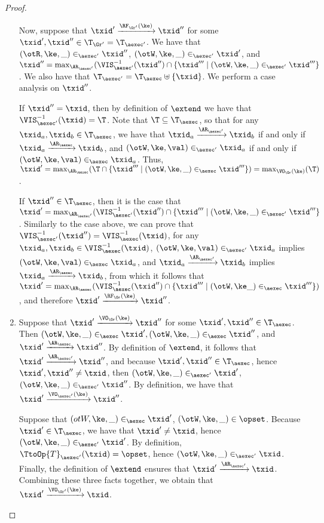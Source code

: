 \begin{proof}
\begin{enumerate}
Now, suppose that $\txid' \xrightarrow{\RF_{\Gr'}(\ke)} \txid''$ for some $\txid', \txid'' \in \T_{\Gr'} = 
\T_{\aexec'}$. We have that $ (\otR, \ke, \_) \in_{\aexec'} \txid''$, 
$(\otW, \ke, \_) \in_{\aexec'} \txid'$, and $\txid'' = \max_{\AR_{\aexec'}}(\VIS_{\aexec'}^{-1}(\txid'') 
\cap \{ \txid''' \mid (\otW, \ke, \_) \in_{\aexec'} \txid'''\}$. 
We also have that $\T_{\aexec'} = \T_{\aexec} \uplus \{\txid\}$. We perform a case 
analysis on $\txid''$. 

If $\txid'' = \txid$, then by definition of $\extend$ we have that 
$\VIS^{-1}_{\aexec'}(\txid) = \T$. Note that $\T \subseteq \T_{\aexec}$, so that 
for any $\txid_{a}, \txid_{b} \in \T_{\aexec}$, we have that $\txid_{a} \xrightarrow{\AR_{\aexec'}} \txid_{b}$ 
if and only if $\txid_{a} \xrightarrow{\AR_{\aexec}} \txid_{b}$, 
and $(\otW, \ke, \val) \in_{\aexec'} \txid_{a}$ if and only if $(\otW, \ke, \val) \in_{\aexec} \txid_{a}$. 
Thus, $\txid' = \max_{\AR_{\aexec}}(\T 
\cap \{\txid''' \mid (\otW, \ke, \_) \in_{\aexec} \txid'''\}) = \max_{\VO_{\Gr}(\ke)}(\T)$. 

If $\txid'' \in \T_{\aexec}$, then it is the case that 
$\txid' = \max_{\AR_{\aexec'}}(\VIS^{-1}_{\aexec'}(\txid'') \cap \{ \txid''' \mid (\otW, \ke, \_) \in_{\aexec'} \txid'''\}$. 
Similarly to the case above, we can prove that $\VIS^{-1}_{\aexec'}(\txid'') = \VIS^{-1}_{\aexec}(\txid)$, 
for any $\txid_{a}, \txid_{b} \in \VIS^{-1}_{\aexec}(\txid)$, $(\otW, \ke, \val) \in_{\aexec'} \txid_{a}$ 
implies $(\otW, \ke, \val) \in_{\aexec} \txid_{a}$, and $\txid_{a} \xrightarrow{\AR_{\aexec'}} \txid_{b}$ 
implies $\txid_{a} \xrightarrow{\AR_{\aexec}} \txid_{b}$, from which it follows that 
$\txid' = \max_{\AR_{\aexec}}(\VIS^{-1}_{\aexec}(\txid'') \cap \{ \txid''' \mid (\otW, \ke \_) \in_{\aexec} \txid'''\})$, 
and therefore $\txid' \xrightarrow{\RF_{\Gr}(\ke)} \txid''$.

\item Suppose that $\txid' \xrightarrow{\VO_{\Gr}(\ke)} \txid''$ for some $\txid', \txid'' \in \T_{\aexec}$. 
Then $(\otW,\ke,\_) \in_{\aexec} \txid', (\otW, \ke, \_) \in_{\aexec} \txid''$, and $\txid' \xrightarrow{\AR_{\aexec}} \txid''$. 
By definition of $\extend$, it follows that $\txid' \xrightarrow{\AR_{\aexec'}} \txid''$, and because 
$\txid', \txid'' \in \T_{\aexec}$, hence $\txid', \txid'' \neq \txid$, then 
$(\otW,\ke, \_) \in_{\aexec'} \txid'$, $(\otW, \ke, \_) \in_{\aexec'} \txid''$. By definition, 
we have that $\txid' \xrightarrow{\VO_{\aexec'}(\ke)} \txid''$.

Suppose that $(otW, \ke, \_) \in_{\aexec} \txid'$, $(\otW, \ke, \_) \in \opset$. Because $\txid' \in \T_{\aexec}$, 
we have that $\txid' \neq \txid$, hence $(\otW, \ke, \_) \in_{\aexec' }\txid'$. By definition, 
$\TtoOp{T}_{\aexec'}(\txid) = \opset$, hence $(\otW, \ke, \_) \in_{\aexec'} \txid$. Finally, 
the definition of $\extend$ ensures that $\txid' \xrightarrow{\AR_{\aexec'}} \txid$. Combining 
these three facts together, we obtain that  
$\txid' \xrightarrow{\VO_{\Gr'}(\ke)} \txid$. 


\end{enumerate}
\end{proof}

